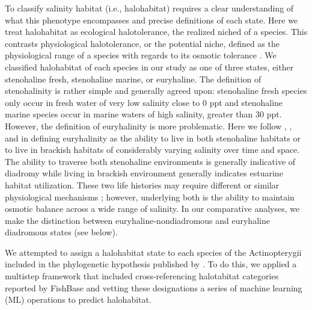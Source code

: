 \documentclass[11pt]{article}
\begin{document}
To classify salinity habitat (i.e., halohabitat) requires a clear understanding of what this phenotype encompasses and precise definitions of each state. Here we treat halohabitat as ecological halotolerance, the realized niched of a species. This contrasts physiological halotolerance, or the potential niche, defined as the physiological range of a species with regards to its osmotic tolerance \citep{schultz2012euryhalinity}.  We classified halohabitat of each species in our study as one of three states, either stenohaline fresh, stenohaline marine, or euryhaline. The definition of stenohalinity is rather simple and generally agreed upon:  stenohaline fresh species only occur in fresh water of very low salinity close to 0 ppt and stenohaline marine species occur in marine waters of high salinity, greater than 30 ppt. However, the definition of euryhalinity is more problematic. Here we follow \cite{schultz2012euryhalinity}, \cite{kultz2015physiological}, and \cite{lee1999causes} in defining euryhalinity as the ability to live in both stenohaline habitats or to live in brackish habitats of considerably varying salinity over time and space. The ability to traverse both stenohaline environments is generally indicative of diadromy while living in brackish environment generally indicates estuarine habitat utilization. These two life histories may require different or similar physiological mechanisms \citep{kultz2015physiological}; however, underlying both is the ability to maintain osmotic balance across a wide range of salinity. In our comparative analyses, we make the distinction between euryhaline-nondiadromous and euryhaline diadromous states (see below).
 
We attempted to assign a halohabitat state to each species of the Actinopterygii included in the phylogenetic hypothesis published by \cite{rabosky2018inverse}. To do this, we applied a multistep framework that included cross-referencing halotabitat categories reported by FishBase \citep{froese2010fishbase} and vetting these designations a series of machine learning (ML) operations to predict halohabitat.
\end{document}

